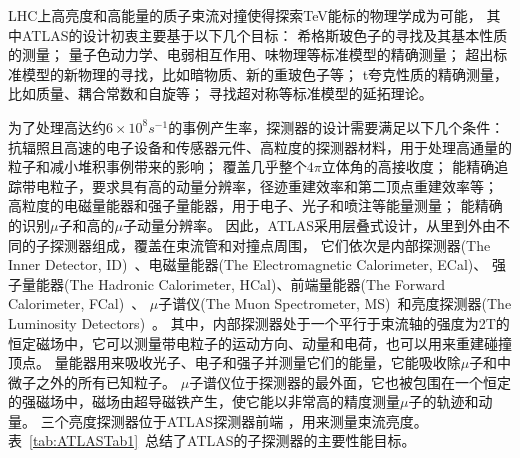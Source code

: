 LHC上高亮度和高能量的质子束流对撞使得探索TeV能标的物理学成为可能，
其中ATLAS的设计初衷主要基于以下几个目标：
希格斯玻色子的寻找及其基本性质的测量；
量子色动力学、电弱相互作用、味物理等标准模型的精确测量；
超出标准模型的新物理的寻找，比如暗物质、新的重玻色子等；
t夸克性质的精确测量，比如质量、耦合常数和自旋等；
寻找超对称等标准模型的延拓理论。

为了处理高达约$6\times10^8s^{-1}$的事例产生率，探测器的设计需要满足以下几个条件：
抗辐照且高速的电子设备和传感器元件、高粒度的探测器材料，用于处理高通量的粒子和减小堆积事例带来的影响；
覆盖几乎整个$4\pi$立体角的高接收度；
能精确追踪带电粒子，要求具有高的动量分辨率，径迹重建效率和第二顶点重建效率等；
高粒度的电磁量能器和强子量能器，用于电子、光子和喷注等能量测量；
能精确的识别$\mu$子和高的$\mu$子动量分辨率。
因此，ATLAS采用层叠式设计，从里到外由不同的子探测器组成，覆盖在束流管和对撞点周围，
它们依次是内部探测器(The Inner Detector, ID)~\cite{ATLASINNER}、电磁量能器(The Electromagnetic Calorimeter, ECal)、
强子量能器(The Hadronic Calorimeter, HCal)、前端量能器(The Forward Calorimeter, FCal)~\cite{ATLASLACA,ATLASTCA}、
$\mu$子谱仪(The Muon Spectrometer, MS)~\cite{ATLASMUSPEC}和亮度探测器(The Luminosity Detectors)~\cite{ATLASLUMID}。
其中，内部探测器处于一个平行于束流轴的强度为2T的恒定磁场中，它可以测量带电粒子的运动方向、动量和电荷，也可以用来重建碰撞顶点。
量能器用来吸收光子、电子和强子并测量它们的能量，它能吸收除$\mu$子和中微子之外的所有已知粒子。
$\mu$子谱仪位于探测器的最外面，它也被包围在一个恒定的强磁场中，磁场由超导磁铁产生，使它能以非常高的精度测量$\mu$子的轨迹和动量。
三个亮度探测器位于ATLAS探测器前端
，用来测量束流亮度。
表~\ref{tab:ATLASTab1}~总结了ATLAS的子探测器的主要性能目标。

